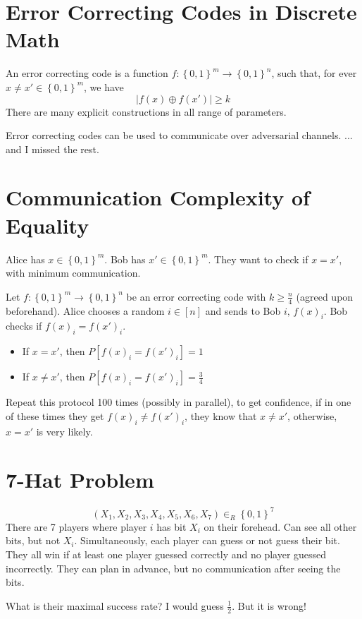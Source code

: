 \documentclass{article}
\begin{document}
\section{Error Correcting Codes in Discrete Math}

An error correcting code is a function $f:\left\{0,1\right\}^m\to \left\{0,1\right\}^n$, such that, for ever $x\neq x'\in\left\{0,1\right\}^m$, we have 
\[
\left| f(x)\oplus f(x') \right|\geq k
\]
There are many explicit constructions in all range of parameters.

Error correcting codes can be used to communicate over adversarial channels. ... and I missed the rest.

\section{Communication Complexity of Equality}

Alice has $x\in\left\{0,1\right\}^m$. Bob has $x'\in\left\{0,1\right\}^m$. They want to check if $x=x'$, with minimum communication.

Let $f:\left\{0,1\right\}^m\to \left\{0,1\right\}^n$ be an error correcting code with $k\geq \frac{n}{4}$ (agreed upon beforehand). Alice chooses a random $i\in\left[n\right]$ and sends to Bob $i,\, f(x)_i$. Bob checks if $f(x)_i= f(x')_i$.
\begin{itemize}
    \item If $x=x'$, then $P\left[f(x)_i=f(x')_i\right]=1$
    \item If $x\neq x'$, then $P\left[f(x)_i=f(x')_i\right]=\frac{3}{4}$
\end{itemize}

Repeat this protocol 100 times (possibly in parallel), to get confidence, if in one of these times they get $f(x)_i\neq f(x')_i$, they know that $x\neq x'$, otherwise, $x=x'$ is very likely.

\section{7-Hat Problem}
\[
\left(X_1,X_2, X_3, X_4, X_5, X_6, X_7\right)\in_R \left\{0,1\right\}^7
\]
There are 7 players where player $i$ has bit $X_i$ on their forehead. Can see all other bits, but not $X_i$. Simultaneously, each player can guess or not guess their bit. They all win if at least one player guessed correctly and no player guessed incorrectly. They can plan in advance, but no communication after seeing the bits.

What is their maximal success rate? I would guess $\frac{1}{2}$. But it is wrong!
\end{document}
